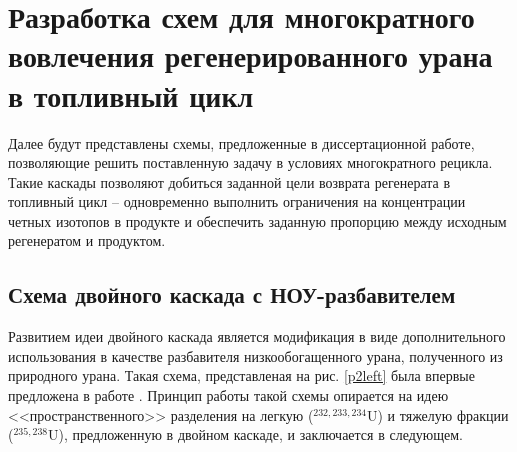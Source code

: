 \chapter{Разработка схем для многократного вовлечения регенерированного урана в топливный цикл}\label{ch:ch3}

Далее будут представлены схемы, предложенные в диссертационной работе, позволяющие решить поставленную задачу в условиях многократного рецикла. Такие каскады позволяют добиться заданной цели возврата регенерата в топливный цикл -- одновременно выполнить ограничения на концентрации четных изотопов в продукте и обеспечить заданную пропорцию между исходным регенератом и продуктом.


\section{Схема двойного каскада с НОУ-разбавителем}

Развитием идеи двойного каскада является модификация в виде дополнительного использования в качестве разбавителя низкообогащенного урана, полученного из природного урана. Такая схема, представленая на рис. \ref{p2left} была впервые предложена в работе \cite{vodolazskihSposobIzotopnogoVosstanovleniya}. Принцип работы такой схемы опирается на идею <<пространственного>> разделения на легкую ($^{232,233,234}$U) и тяжелую фракции ($^{235,238}$U), предложенную в двойном каскаде, и заключается в следующем. 

